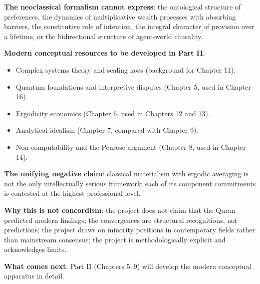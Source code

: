 \begin{summarybox}
\textbf{The neoclassical formalism cannot express}: the ontological
structure of preferences, the dynamics of multiplicative wealth
processes with absorbing barriers, the constitutive role of
intention, the integral character of provision over a lifetime, or
the bidirectional structure of agent-world causality.

\textbf{Modern conceptual resources to be developed in Part II}:
\begin{itemize}[leftmargin=1.5em]
    \item Complex systems theory and scaling laws (background for
    Chapter 11).
    \item Quantum foundations and interpretive disputes (Chapter 5,
    used in Chapter 16).
    \item Ergodicity economics (Chapter 6, used in Chapters 12 and
    13).
    \item Analytical idealism (Chapter 7, compared with Chapter 9).
    \item Non-computability and the Penrose argument (Chapter 8,
    used in Chapter 14).
\end{itemize}

\textbf{The unifying negative claim}: classical materialism with
ergodic averaging is not the only intellectually serious framework;
each of its component commitments is contested at the highest
professional level.

\textbf{Why this is not concordism}: the project does not claim that
the Quran predicted modern findings; the convergences are structural
recognitions, not predictions; the project draws on minority
positions in contemporary fields rather than mainstream consensus;
the project is methodologically explicit and acknowledges limits.

\textbf{What comes next}: Part II (Chapters 5--9) will develop the
modern conceptual apparatus in detail.
\end{summarybox}

\cleardoublepage
